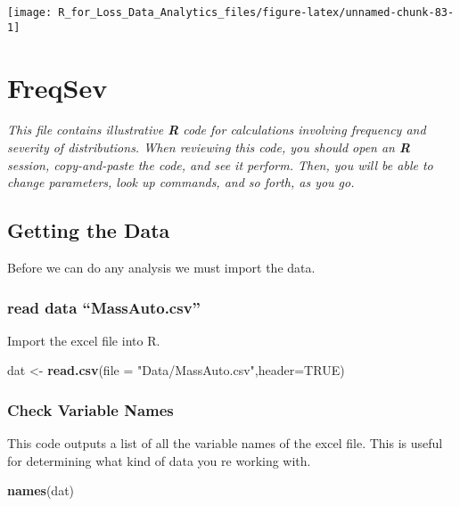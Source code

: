 \documentclass[]{book}
\newenvironment{Shaded}{\begin{snugshade}}{\end{snugshade}}
\newcommand{\KeywordTok}[1]{\textcolor[rgb]{0.13,0.29,0.53}{\textbf{#1}}}
\newcommand{\DataTypeTok}[1]{\textcolor[rgb]{0.13,0.29,0.53}{#1}}
\newcommand{\StringTok}[1]{\textcolor[rgb]{0.31,0.60,0.02}{#1}}
\newcommand{\OtherTok}[1]{\textcolor[rgb]{0.56,0.35,0.01}{#1}}
\newcommand{\NormalTok}[1]{#1}
\theoremstyle{definition}
\theoremstyle{definition}
\theoremstyle{definition}
\theoremstyle{remark}
\begin{document}
\begin{center}\texttt{[image: R\_for\_Loss\_Data\_Analytics\_files/figure-latex/unnamed-chunk-83-1]} \end{center}

\chapter{FreqSev}\label{freqsev}

\emph{This file contains illustrative \textbf{R} code for calculations
involving frequency and severity of distributions. When reviewing this
code, you should open an \textbf{R} session, copy-and-paste the code,
and see it perform. Then, you will be able to change parameters, look up
commands, and so forth, as you go. }

\section{Getting the Data}\label{getting-the-data}

Before we can do any analysis we must import the data.

\subsection{\texorpdfstring{read data
``MassAuto.csv''}{read data MassAuto.csv}}\label{read-data-massauto.csv}

Import the excel file into R.

\begin{Shaded}
\begin{Highlighting}[]
\NormalTok{dat <-}\StringTok{ }\KeywordTok{read.csv}\NormalTok{(}\DataTypeTok{file =} \StringTok{"Data/MassAuto.csv"}\NormalTok{,}\DataTypeTok{header=}\OtherTok{TRUE}\NormalTok{)}
\end{Highlighting}
\end{Shaded}

\subsection{Check Variable Names}\label{check-variable-names}

This code outputs a list of all the variable names of the excel file.
This is useful for determining what kind of data you re working with.

\begin{Shaded}
\begin{Highlighting}[]
\KeywordTok{names}\NormalTok{(dat)}
\end{Highlighting}
\end{Shaded}
\end{document}
